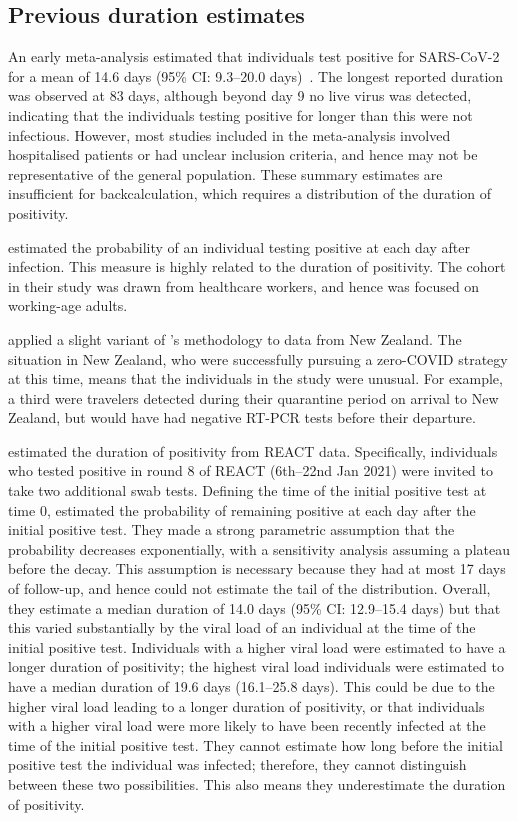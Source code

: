 \documentclass[thesis.tex]{subfiles}
\begin{document}
\subsection{Previous duration estimates}

An early meta-analysis estimated that individuals test positive for SARS-CoV-2 for a mean of 14.6 days (95\% CI: 9.3--20.0 days)~\autocite{cevikShedding}.
The longest reported duration was observed at 83 days, although beyond day 9 no live virus was detected, indicating that the individuals testing positive for longer than this were not infectious.
However, most studies included in the meta-analysis involved hospitalised patients or had unclear inclusion criteria, and hence may not be representative of the general population.
These summary estimates are insufficient for backcalculation, which requires a distribution of the duration of positivity.

\Textcite{hellewellPCRSensitivity} estimated the probability of an individual testing positive at each day after infection.
This measure is highly related to the duration of positivity.
The cohort in their study was drawn from healthcare workers, and hence was focused on working-age adults.

\Textcite{binnySensitivity} applied a slight variant of \textcite{hellewellPCRSensitivity}'s methodology to data from New Zealand.
The situation in New Zealand, who were successfully pursuing a zero-COVID strategy at this time, means that the individuals in the study were unusual.
For example, a third were travelers detected during their quarantine period on arrival to New Zealand, but would have had negative RT-PCR tests before their departure.

\Textcite{ealesCharacterising} estimated the duration of positivity from REACT data.
Specifically, individuals who tested positive in round 8 of REACT (6th--22nd Jan 2021) were invited to take two additional swab tests.
Defining the time of the initial positive test at time 0, \textcite{ealesCharacterising} estimated the probability of remaining positive at each day after the initial positive test.
They made a strong parametric assumption that the probability decreases exponentially, with a sensitivity analysis assuming a plateau before the decay.
This assumption is necessary because they had at most 17 days of follow-up, and hence could not estimate the tail of the distribution.
Overall, they estimate a median duration of 14.0 days (95\% CI: 12.9--15.4 days) but that this varied substantially by the viral load of an individual at the time of the initial positive test.
Individuals with a higher viral load were estimated to have a longer duration of positivity; the highest viral load individuals were estimated to have a median duration of 19.6 days (16.1--25.8 days).
This could be due to the higher viral load leading to a longer duration of positivity, or that individuals with a higher viral load were more likely to have been recently infected at the time of the initial positive test.
They cannot estimate how long before the initial positive test the individual was infected; therefore, they cannot distinguish between these two possibilities.
This also means they underestimate the duration of positivity.
\end{document}
